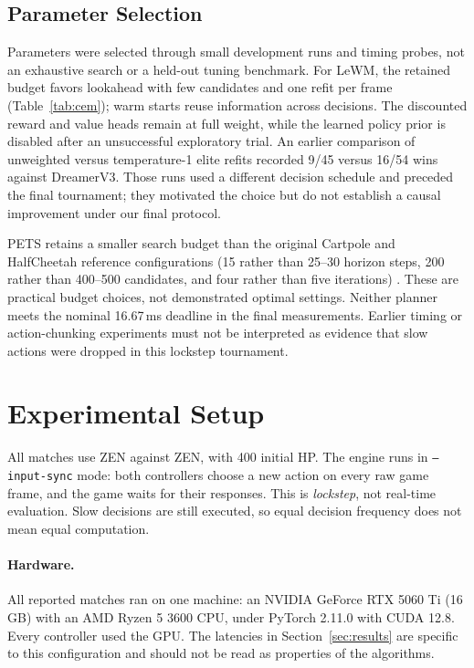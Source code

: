 \documentclass[10pt,twocolumn]{article}
\newcommand{\lewm}{LeWM}
\newcommand{\dreamer}{DreamerV3}
\newcommand{\pets}{PETS}
\begin{document}
\subsection{Parameter Selection}

Parameters were selected through small development runs and timing probes,
not an exhaustive search or a held-out tuning benchmark.  For \lewm{},
the retained budget favors lookahead with few candidates and one refit per
frame (Table~\ref{tab:cem}); warm starts reuse information across decisions.
The discounted reward and value heads remain at full weight, while the
learned policy prior is disabled after an unsuccessful exploratory trial.
An earlier comparison of unweighted versus temperature-1 elite refits
recorded 9/45 versus 16/54 wins against \dreamer{}.  Those runs used a
different decision schedule and preceded the final tournament; they motivated
the choice but do not establish a causal improvement under our final protocol.

\pets{} retains a smaller search budget than the original Cartpole and
HalfCheetah reference configurations (15 rather than 25--30 horizon steps, 200 rather than
400--500 candidates, and four rather than five iterations)
\cite{petsReferenceCode}.  These are practical budget choices, not demonstrated
optimal settings.  Neither planner meets the nominal 16.67\,ms deadline
in the final measurements.  Earlier timing or action-chunking experiments
must not be interpreted as evidence that slow actions were dropped in
this lockstep tournament.

\section{Experimental Setup}

All matches use ZEN against ZEN, with 400 initial HP.  The engine runs in
\texttt{--input-sync} mode: both controllers choose a new action on every raw
game frame, and the game waits for their responses.  This is \emph{lockstep},
not real-time evaluation.  Slow decisions are still executed, so equal
decision frequency does not mean equal computation.

\paragraph{Hardware.}
All reported matches ran on one machine: an NVIDIA GeForce RTX 5060 Ti
(16\,GB) with an AMD Ryzen 5 3600 CPU, under PyTorch 2.11.0 with CUDA 12.8.
Every controller used the GPU.  The latencies in Section~\ref{sec:results}
are specific to this configuration and should not be read as properties of
the algorithms.
\end{document}

